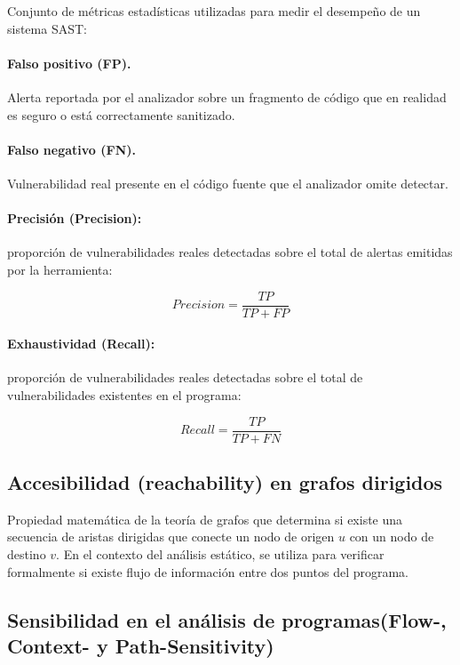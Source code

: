 Conjunto de métricas estadísticas utilizadas para medir el desempeño de un sistema SAST:

\paragraph{Falso positivo (FP).} Alerta reportada por el analizador sobre un fragmento de código que en realidad es seguro o está correctamente sanitizado.

\paragraph{Falso negativo (FN).} Vulnerabilidad real presente en el código fuente que el analizador omite detectar.

\paragraph{Precisión (Precision):} proporción de vulnerabilidades reales detectadas sobre el total de alertas emitidas por la herramienta:

\[ \mathit{Precision} = \frac{TP}{TP + FP} \]

\paragraph{Exhaustividad (Recall):} proporción de vulnerabilidades reales detectadas sobre el total de vulnerabilidades existentes en el programa:

\[ \mathit{Recall} = \frac{TP}{TP + FN} \]

\subsection{Accesibilidad (reachability) en grafos dirigidos}\label{sec:n3.3.4}

Propiedad matemática de la teoría de grafos que determina si existe una secuencia de aristas dirigidas que conecte un nodo de origen $u$ con un nodo de destino $v$. En el contexto del análisis estático, se utiliza para verificar formalmente si existe flujo de información entre dos puntos del programa.

\subsection[Sensibilidad en el análisis de programas]{Sensibilidad en el análisis de programas\newline (Flow-, Context- y Path-Sensitivity)}\label{sec:n3.3.5}


